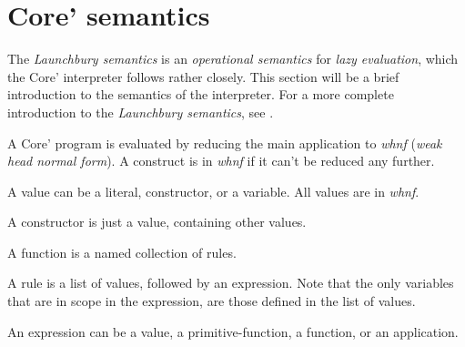 \section{Core' semantics}

The \emph{Launchbury semantics} is an \emph{operational semantics} for 
\emph{lazy evaluation}, which the Core' interpreter follows rather closely. 
This section will be a brief introduction to the semantics of the interpreter.
For a more complete introduction to 
the \emph{Launchbury semantics}, see \cite{launchbury1993natural}. 

A Core' program is evaluated by reducing the main application to \emph{whnf} 
(\emph{weak head normal form}). A construct is in \emph{whnf} if it can't be
reduced any further.


A value can be a literal, constructor, or a variable. All values are in \emph{whnf}.


A constructor is just a value, containing other values.


A function is a named collection of rules.


A rule is a list of values, followed by an expression. Note that the only variables
that are in scope in the expression, are those defined in the list of values.


An expression can be a value, a primitive-function, a function, or an application.


